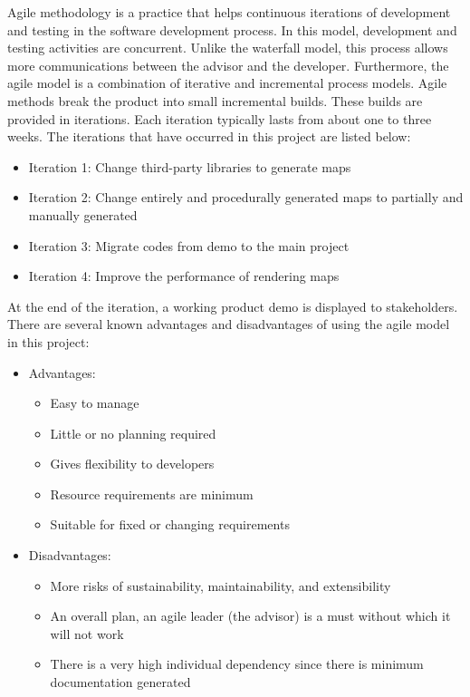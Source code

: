 Agile methodology is a practice that helps continuous iterations of development and testing in the software development process. In this model, development and testing activities are concurrent. Unlike the waterfall model, this process allows more communications between the advisor and the developer. Furthermore, the agile model is a combination of iterative and incremental process models. Agile methods break the product into small incremental builds. These builds are provided in iterations. Each iteration typically lasts from about one to three weeks. The iterations that have occurred in
this project are listed below:
\begin{itemize}
  \item Iteration 1: Change third-party libraries to generate maps
  \item Iteration 2: Change entirely and procedurally generated maps to partially and manually generated
  \item Iteration 3: Migrate codes from demo to the main project
  \item Iteration 4: Improve the performance of rendering maps
\end{itemize}
At the end of the iteration, a working product demo is displayed to stakeholders. There are several known advantages and disadvantages of using the agile model in this project:
\begin{itemize}

  \item Advantages:
  \begin{itemize}
    \item Easy to manage
    \item Little or no planning required
    \item Gives flexibility to developers
    \item Resource requirements are minimum
    \item Suitable for fixed or changing requirements
  \end{itemize}

  \item Disadvantages:
  \begin{itemize}
    \item More risks of sustainability, maintainability, and extensibility
    \item An overall plan, an agile leader (the advisor) is a must without which it will not work
    \item There is a very high individual dependency since there is minimum documentation generated
  \end{itemize}
  
\end{itemize}

